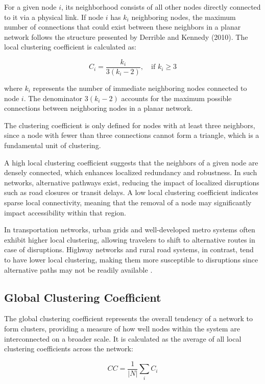 For a given node \( i \), its neighborhood consists of all other nodes directly connected to it via a physical link. If node \( i \) has \( k_i \) neighboring nodes, the maximum number of connections that could exist between these neighbors in a planar network follows the structure presented by Derrible and Kennedy (2010). The local clustering coefficient is calculated as:

\begin{equation}
C_i = \frac{k_i}{3(k_i - 2)}, \quad \text{if } k_i \geq 3
\end{equation}

where \( k_i \) represents the number of immediate neighboring nodes connected to node \( i \). The denominator \( 3(k_i - 2) \) accounts for the maximum possible connections between neighboring nodes in a planar network.

The clustering coefficient is only defined for nodes with at least three neighbors, since a node with fewer than three connections cannot form a triangle, which is a fundamental unit of clustering.

A high local clustering coefficient suggests that the neighbors of a given node are densely connected, which enhances localized redundancy and robustness. In such networks, alternative pathways exist, reducing the impact of localized disruptions such as road closures or transit delays. A low local clustering coefficient indicates sparse local connectivity, meaning that the removal of a node may significantly impact accessibility within that region.

In transportation networks, urban grids and well-developed metro systems often exhibit higher local clustering, allowing travelers to shift to alternative routes in case of disruptions. Highway networks and rural road systems, in contrast, tend to have lower local clustering, making them more susceptible to disruptions since alternative paths may not be readily available \cite{taylor2017}.

\subsection{Global Clustering Coefficient}
The global clustering coefficient represents the overall tendency of a network to form clusters, providing a measure of how well nodes within the system are interconnected on a broader scale. It is calculated as the average of all local clustering coefficients across the network:

\begin{equation}
CC = \frac{1}{|N|} \sum_{i} C_i
\end{equation}

